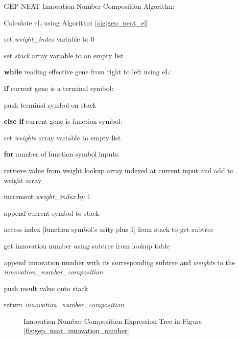 \parbreak
\begin{algorithm}
	\caption{GEP-NEAT Innovation Number Composition Algorithm}\label{alg:gep_neat_innovation_number_composition}
	\begin{algorithmic}[1]
	\item Calculate eL using Algorithm \ref{alg:gep_neat_el}
	\item set \textit{weight\_index} variable to 0
	\item set \textit{stack} array variable to an empty list
	\item \textbf{while} reading effective gene from right to left using eL:
	\item \quad \textbf{if} current gene is a terminal symbol:
	\item \quad \quad push terminal symbol on stack
	\item \quad \textbf{else if} current gene is function symbol:
	\item \quad \quad set \textit{weights} array variable to empty list
	\item \quad \quad \textbf{for} number of function symbol inputs:
	\item \quad \quad \quad retrieve value from weight lookup array indexed at current input and add to weight array
	\item \quad \quad \quad increment \textit{weight\_index} by 1
	\item \quad \quad append  current symbol to stack
	\item \quad \quad access index [function symbol's arity plus 1] from stack to get subtree
	\item \quad \quad get innovation number using subtree from lookup table
	\item \quad \quad append innovation number with its corresponding subtree and \textit{weights} to the \textit{innovation\_number\_composition}
	\item \quad \quad push result value onto stack
	\item return \textit{innovation\_number\_composition}
\end{algorithmic}
\end{algorithm}

\parbreak
\begin{figure}[H] %
	\centering %
	\caption{Innovation Number Composition Expression Tree in Figure \ref{fig:gep_neat_innovation_number}}
	\label{fig:gep_neat_innovation_number_composition} %
\end{figure}

